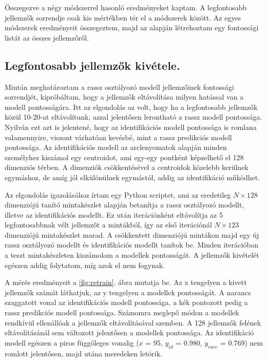 Összegezve a négy módszerrel hasonló eredményeket kaptam. A legfontosabb jellemzők sorrendje csak kis mértékben tér el a módszerek között. Az egyes módszerek eredményeit összegeztem, majd az alapján létrehoztam egy fontossági listát az összes jellemzőről.

\subsection{Legfontosabb jellemzők kivétele.}

Miután meghatároztam a rassz osztályozó modell jellemzőinek fontossági sorrendjét, kipróbáltam, hogy a jellemzők eltávolítása milyen hatással van a modell pontosságára. Itt az elgondolás az volt, hogy ha a legfontosabb jellemzők közül 10-20-at eltávolítunk, azzal jelentősen lerontható a rassz modell pontossága. Nyilván ezt azt is jelentené, hogy az identifikációs modell pontossága is romlana valamennyire, viszont várhatóan kevésbé, mint a rassz predikciós modell pontossága. Az identifikációs modell az arclenyomatok alapján minden személyhez kiszámol egy centroidot, ami egy-egy pontként képzelhető el 128 dimenziós térben. A dimenziók csökkentésével a centroidok közelebb kerülnek egymáshoz, de amíg jól elkülönülnek egymástól, addig az identifikáció működhet.

Az elgondolás igazolásához írtam egy Python scriptet, ami az eredetileg $N \times 128$ dimenziójú tanító mintakészlet alapján betanítja a rassz osztályozó modellt, illetve az identifikációs modellt. Ez után iterációnként eltávolítja az 5 legfontosabbnak vélt jellemzőt a mintákból, így az első iterációnál $N \times 123$ dimenziójú mintakészlet marad. A csökkentett dimenziójú mintákon majd egy új rassz osztályozó modellt és identifikációs modellt tanítok be. Minden iterációban a teszt mintakészleten kiszámolom a modellek pontosságát. A jellemzők kivételét egészen addig folytatom, míg azok el nem fogynak. 

A mérés eredményeit a \ref{fig:retrain}. ábra mutatja be. Az x tengelyen a kivett jellemzők számát láthatjuk, az y tengelyen a modellek pontosságát. A narancs szaggatott vonal az identifikációs modell pontossága, a kék pontozott pedig a rassz predikciós modell pontossága. Számomra meglepő módon a modellek rendkívül ellenállóak a jellemzők eltávolításával szemben. A 128 jellemzők felének eltávolításánál sem változott jelentősen a modellek pontossága. Az identifikáció modell egészen a piros függőleges vonalig ($x$ = 95, $y_{id}$ = 0.980, $y_{race}$ = 0.769) nem romlott jelentősen, majd utána meredeken letörik.

